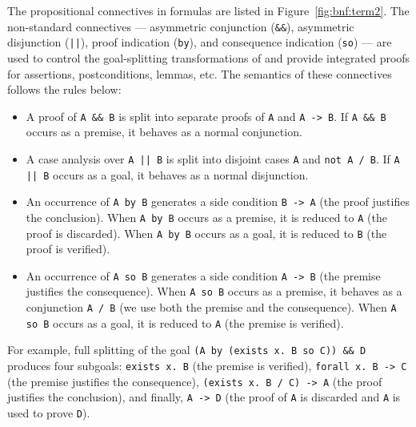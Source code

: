 The propositional connectives in \whyml formulas are listed in
Figure~\ref{fig:bnf:term2}. The non-standard connectives ---
asymmetric conjunction (\texttt{\&\&}), asymmetric disjunction
(\texttt{||}), proof indication (\texttt{by}), and consequence
indication (\texttt{so}) --- are used to control the goal-splitting
transformations of \why and provide integrated proofs for
\whyml assertions, postconditions, lemmas, etc.
The semantics of these connectives
follows the rules below:
\begin{itemize}
\item A proof of \texttt{A \&\& B} is split into
separate proofs of \texttt{A} and \texttt{A -> B}.
If \texttt{A \&\& B} occurs as a premise, it behaves
as a normal conjunction.
\item A case analysis over \texttt{A || B} is split into
disjoint cases \texttt{A} and \texttt{not A {/} B}.
If \texttt{A || B} occurs as a goal, it behaves
as a normal disjunction.
\item An occurrence of \texttt{A by B} generates a side condition
\texttt{B -> A} (the proof justifies the conclusion).
When \texttt{A by B} occurs as a premise,
it is reduced to \texttt{A} (the proof is discarded).
When \texttt{A by B} occurs as a goal,
it is reduced to \texttt{B} (the proof is verified).
\item An occurrence of \texttt{A so B} generates a side condition
\texttt{A -> B} (the premise justifies the consequence).
When \texttt{A so B} occurs as a premise,
it behaves as a conjunction \texttt{A {/} B}
(we use both the premise and the consequence).
When \texttt{A so B} occurs as a goal,
it is reduced to \texttt{A} (the premise is verified).
\end{itemize}
For example, full splitting of the goal
\texttt{(A by (exists x. B so C)) \&\& D}
produces four subgoals:
\texttt{exists x. B} (the premise is verified),
\texttt{forall x. B -> C} (the premise justifies the consequence),
\texttt{(exists x. B {/} C) -> A} (the proof justifies the conclusion),
and finally, \texttt{A -> D} (the proof of \texttt{A} is discarded
and \texttt{A} is used to prove \texttt{D}).

